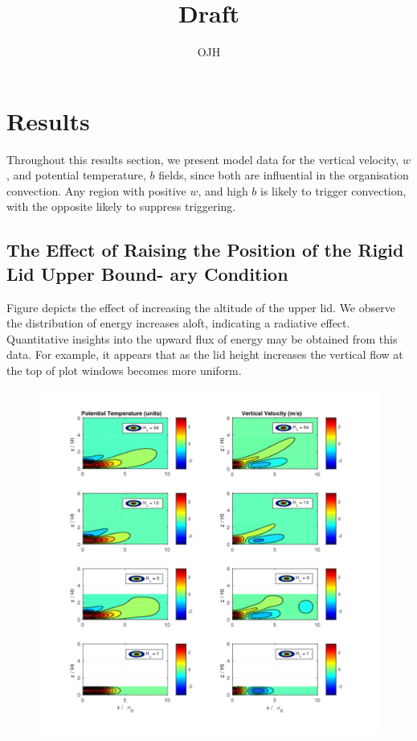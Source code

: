 \documentclass[a4paper,10pt]{article}
\title{Draft}
\author{OJH}
\begin{document}
\maketitle

\begin{abstract}

\end{abstract}

\section{Results}
Throughout this results section, we present model data for the vertical velocity, $w$,  and
potential temperature, $b$ fields, since both are influential in the organisation convection. Any
region with positive $w$, and high $b$ is likely to trigger convection, with the opposite likely to
suppress triggering.

\subsection{The Effect of Raising the Position of the Rigid Lid Upper Bound-
ary Condition}
Figure  depicts the effect of increasing the
altitude of the upper lid. We observe the distribution of energy increases aloft, indicating a
radiative effect. Quantitative insights into the upward flux of energy may be obtained from this
data. For example, it appears that as the lid height increases the vertical flow at the top of plot
windows becomes more uniform.

\begin{figure}
  \caption{}
  \centering
    \includegraphics[width=1\textwidth]{raise_lid_t1.pdf}
  \label{raise_lid_t1}
\end{figure}
\end{document}
